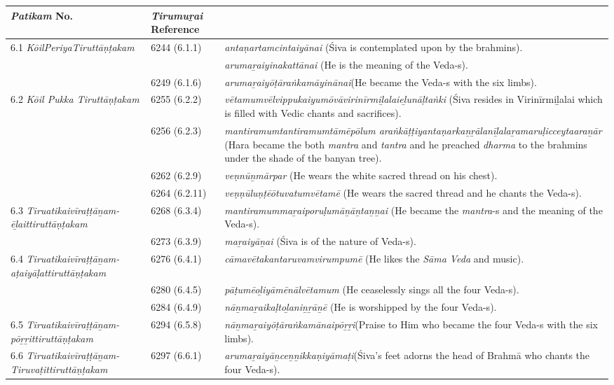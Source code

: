 \begin{longtable}{|m{2.7cm}|m{2.7cm}|>{\raggedright}m{3.1cm}|}
\hline
\multicolumn{1}{|m{2.5cm}}{\centering \textit{Patikam} No.} & \multicolumn{1}{|m{2.5cm}}{\centering \textit{Tirumuṟai} Reference} & \multicolumn{1}{|m{2.5cm}|}{\centering Text} \\
\hline
6.1 \textit{KōilPeriyaTiruttāṇṭakam} & 6244 (6.1.1) & \textit{antaṇartamcintaiyānai}  (Śiva is contemplated upon by the brahmins). \tabularnewline
\hline
 &  & \textit{arumaṟaiyinakattānai} (He is the meaning of the Veda-s). \tabularnewline
\hline
 & 6249 (6.1.6) & \textit{arumaṟaiyōṭāraṅkamā\-yinānai}(He became the Veda-s with the six limbs). \tabularnewline
\hline
6.2 \textit{Kōil Pukka Tiruttāṇṭakam} & 6255 (6.2.2) & \textit{vētamumvēlvippukai\-yumōvāvirinīrmiḻalai\-eḻunāḷtaṅki} (Śiva resides in Virinīrmiḻalai which is filled with Vedic chants and sacrifices). \tabularnewline
\hline
 & 6256 (6.2.3) & \textit{mantiramumtantira\-mumtāmēpōlum araṅkāṭṭiyantaṇarkaṉṟālanīḻalaṟamaruḷicceytaaraṉār} (Hara became the both \textit{mantra }\index{mantra@\textit{mantra}} and \textit{tantra}\index{tantra@\textit{tantra}} and he preached \textit{dharma} to the brahmins\index{Brahmins} under the shade of the banyan tree). \tabularnewline
\hline
 & 6262 (6.2.9) & \textit{veṇnūṉmārpar} (He wears the white sacred thread on his chest). \tabularnewline
\hline
 & 6264 (6.2.11) & \textit{veṇṇūluṇṭēōtuvatum\-vētamē} (He wears the sacred thread\index{sacred thread} and he chants the Veda-s). \tabularnewline
\hline
6.3 \textit{Tiruatikaivīraṭṭāṉam-ēḻaittiruttāṇṭakam} & 6268 (6.3.4) & \textit{mantiramummaṟai\-poruḷumāṉāṉtaṉṉai} (He became the \textit{mantra}-s and the meaning of the Veda-s). \tabularnewline
\hline
 & 6273 (6.3.9) & \textit{maṟaiyāṉai} (Śiva is of the nature of Veda-s). \tabularnewline
\hline
6.4 \textit{Tiruatikaivīraṭṭā\-ṉam-aṭaiyāḷatti\-ruttāṇṭakam} & 6276 (6.4.1) & \textit{cāmavētakantaruvam\-virumpumē} (He likes the \textit{Sāma Veda} and music). \tabularnewline
\hline
 & 6280 (6.4.5) & \textit{pāṭumēoḻiyāmēnālvēta\-mum} (He ceaselessly sings all the four Veda-s). \tabularnewline
\hline
 & 6284 (6.4.9) & \textit{nāṉmaṟaikaḷtoḻaniṉṟāṉē} (He is worshipped by the four Veda-s). \tabularnewline
\hline
6.5 \textit{Tiruatikaivīra\-ṭṭāṉam-pōṟṟitti\-ruttāṇṭakam} & 6294 (6.5.8) & \textit{nāṉmaṟaiyōṭāraṅkamā\-naipōṟṟi}(Praise to Him who became the four Veda-s with the six limbs). \tabularnewline
\hline
6.6 \textit{Tiruatikaivīraṭṭāṉam-Tiruvaṭittiruttāṇ\-ṭakam} & 6297 (6.6.1) & \textit{arumaṟaiyāṉceṉṉikka\-ṇiyāmaṭi}(Śiva’s feet adorns the head of Brahmā\index{Brahma@Brahmā} who chants the four Veda-s). \tabularnewline

\end{longtable}
